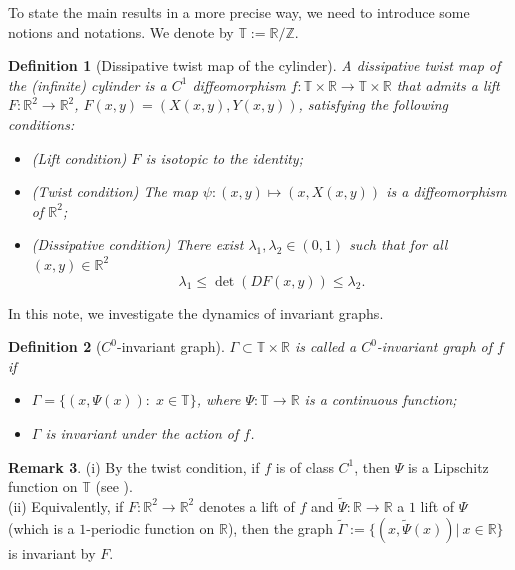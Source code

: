 \documentclass{amsart}
\newcommand{\Z}{\mathbb{Z}}
\newcommand{\R}{\mathbb{R}}
\newcommand{\T}{\mathbb{T}}
\newtheorem{Definition}{Definition}[section]
\theoremstyle{definition}
\newtheorem{Remark}[Definition]{Remark}
\begin{document}
To state the main results in a more precise way, we need to introduce some notions and notations. We denote by $\T:=\R/\Z$.
\begin{Definition}[Dissipative twist map of the cylinder]\label{dissmap}
A {\it dissipative twist map}  of the (infinite) cylinder is a  $C^1$ diffeomorphism $f:\T \times \R \rightarrow \T \times \R  $ that admits a lift
$F:\R^{2}\rightarrow \R^2$, $F(x,y)=(X(x,y),Y(x,y))$, satisfying the following conditions:
\begin{itemize}
    \item[(i)]  ({\it Lift condition}) $F$ is isotopic to the identity;
    \item[(ii)] ({\it Twist condition}) The map $\psi:(x,y)\mapsto(x,X(x,y))$ is a diffeomorphism of $\R^2$;
    \item[(iii)]    ({\it Dissipative condition}) There exist $\lambda_1,\lambda_2\in (0,1)$ such that for all $(x,y)\in \R^2$
\[\lambda_1\leq \det(DF(x,y))\leq \lambda_2.\]
\end{itemize}
\end{Definition}




In this note, we investigate the dynamics of invariant graphs.

\begin{Definition}[$C^0$-invariant graph]\label{c0graph}
$\Gamma\subset\T\times\R$ is called a $C^0$-invariant graph of $f$ if
\begin{itemize}
\item[(i)] $\Gamma=\{(x,\Psi(x)):\; x \in \T\}$, where $\Psi:\T\to\R$ is a continuous function;
\item[(ii)] $\Gamma$ is invariant under the action of  $f$.
\end{itemize}
\end{Definition}

\begin{Remark}
{(i)} By the twist condition, if $f$ is of class $C^1$, then $\Psi$ is a Lipschitz function on $\T$ (see \cite[Proposition 2.2]{H1}).\\
{(ii)} Equivalently, if $F: \R^2 \to \R^2$ denotes a lift of $f$ and $\tilde{\Psi}:\R\to\R$  a $1$ lift of $\Psi$ (which is a $1$-periodic function on $\R$), then  the graph $\tilde{\Gamma}:=\{(x,\tilde{\Psi}(x)) |\ x\in\R\}$  is invariant by $F$.
\end{Remark}
\end{document}
